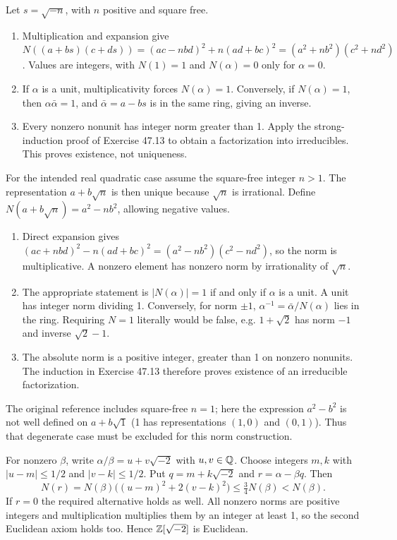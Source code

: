Let $s=\sqrt{-n}$, with $n$ positive and square free.
\begin{enumerate}[label=(\alph*)]
\item Multiplication and expansion give $N((a+bs)(c+ds))=(ac-nbd)^2+n(ad+bc)^2=(a^2+nb^2)(c^2+nd^2)$. Values are integers, with $N(1)=1$ and $N(\alpha)=0$ only for $\alpha=0$.
\item If $\alpha$ is a unit, multiplicativity forces $N(\alpha)=1$. Conversely, if $N(\alpha)=1$, then $\alpha\bar\alpha=1$, and $\bar\alpha=a-bs$ is in the same ring, giving an inverse.
\item Every nonzero nonunit has integer norm greater than 1. Apply the strong-induction proof of Exercise 47.13 to obtain a factorization into irreducibles. This proves existence, not uniqueness.
\end{enumerate}

For the intended real quadratic case assume the square-free integer $n>1$. The representation $a+b\sqrt n$ is then unique because $\sqrt n$ is irrational. Define $N(a+b\sqrt n)=a^2-nb^2$, allowing negative values.
\begin{enumerate}[label=(\alph*)]
\item Direct expansion gives $(ac+nbd)^2-n(ad+bc)^2=(a^2-nb^2)(c^2-nd^2)$, so the norm is multiplicative. A nonzero element has nonzero norm by irrationality of $\sqrt n$.
\item The appropriate statement is $|N(\alpha)|=1$ if and only if $\alpha$ is a unit. A unit has integer norm dividing 1. Conversely, for norm $\pm1$, $\alpha^{-1}=\bar\alpha/N(\alpha)$ lies in the ring. Requiring $N=1$ literally would be false, e.g. $1+\sqrt2$ has norm $-1$ and inverse $\sqrt2-1$.
\item The absolute norm is a positive integer, greater than 1 on nonzero nonunits. The induction in Exercise 47.13 therefore proves existence of an irreducible factorization.
\end{enumerate}
The original reference includes square-free $n=1$; here the expression $a^2-b^2$ is not well defined on $a+b\sqrt1$ (1 has representations $(1,0)$ and $(0,1)$). Thus that degenerate case must be excluded for this norm construction.

For nonzero $\beta$, write $\alpha/\beta=u+v\sqrt{-2}$ with $u,v\in\mathbb{Q}$. Choose integers $m,k$ with $|u-m|\le1/2$ and $|v-k|\le1/2$. Put $q=m+k\sqrt{-2}$ and $r=\alpha-\beta q$. Then
\[N(r)=N(\beta)\big((u-m)^2+2(v-k)^2\big)\le\tfrac34N(\beta)<N(\beta).\]
If $r=0$ the required alternative holds as well. All nonzero norms are positive integers and multiplication multiplies them by an integer at least 1, so the second Euclidean axiom holds too. Hence $\mathbb{Z}[\sqrt{-2}]$ is Euclidean.
